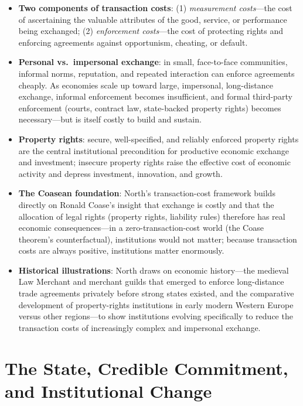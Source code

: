 \documentclass[12pt]{article}
\begin{document}
\begin{itemize}[leftmargin=*, itemsep=4pt]
    \item \textbf{Two components of transaction costs}: (1) \textit{measurement costs}---the cost of ascertaining the valuable attributes of the good, service, or performance being exchanged; (2) \textit{enforcement costs}---the cost of protecting rights and enforcing agreements against opportunism, cheating, or default.
    \item \textbf{Personal vs.\ impersonal exchange}: in small, face-to-face communities, informal norms, reputation, and repeated interaction can enforce agreements cheaply. As economies scale up toward large, impersonal, long-distance exchange, informal enforcement becomes insufficient, and formal third-party enforcement (courts, contract law, state-backed property rights) becomes necessary---but is itself costly to build and sustain.
    \item \textbf{Property rights}: secure, well-specified, and reliably enforced property rights are the central institutional precondition for productive economic exchange and investment; insecure property rights raise the effective cost of economic activity and depress investment, innovation, and growth.
    \item \textbf{The Coasean foundation}: North's transaction-cost framework builds directly on Ronald Coase's insight that exchange is costly and that the allocation of legal rights (property rights, liability rules) therefore has real economic consequences---in a zero-transaction-cost world (the Coase theorem's counterfactual), institutions would not matter; because transaction costs are always positive, institutions matter enormously.
    \item \textbf{Historical illustrations}: North draws on economic history---the medieval Law Merchant and merchant guilds that emerged to enforce long-distance trade agreements privately before strong states existed, and the comparative development of property-rights institutions in early modern Western Europe versus other regions---to show institutions evolving specifically to reduce the transaction costs of increasingly complex and impersonal exchange.
\end{itemize}

\section{The State, Credible Commitment, and Institutional Change}
\end{document}
